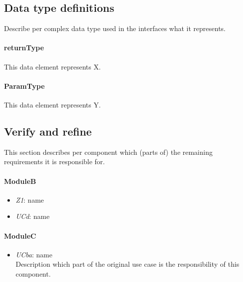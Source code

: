 \subsection{Data type definitions}
    Describe per complex data type used in the interfaces what it represents.

    \paragraph{returnType} This data element represents X.

    \paragraph{ParamType} This data element represents Y.

\subsection{Verify and refine}
    This section describes per component which (parts of) the remaining
    requirements it is responsible for.

    \paragraph{ModuleB}
    \begin{itemize}
    	\item \emph{Z1}: name
    	\item \emph{UCd}: name
    \end{itemize}

    \paragraph{ModuleC}
    \begin{itemize}
    	\item \emph{UCba}: name\\Description which part of the original use case is
    	the responsibility of this component.
    \end{itemize}
